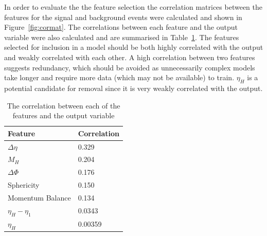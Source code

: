 	
In order to evaluate the the feature selection the correlation matrices between the features for the signal and background events were calculated and shown in Figure~\ref{fig:cormat}. 
The correlations between each feature and the output variable were also calculated and are summarised in  Table~\ref{tab:corr}. 
The features selected for inclusion in a model should be both highly correlated with the output and weakly correlated with each other. A high correlation between two features suggests redundancy, which should be avoided as unnecessarily complex models take longer and require more data (which may not be available) to train.
$\eta_{H}$ is a potential candidate for removal since it is very weakly correlated with the output.  
	\begin{table}
		\begin{center}
		\begin{tabular}{ll}
			\textbf{Feature} & \textbf{Correlation} \\
			\hline
			$\Delta\eta$ & 0.329\\			
			$M_{H}$ & 0.204 \\
			$\Delta\Phi$ &  0.176\\
			Sphericity & 0.150\\
			Momentum Balance &  0.134\\
			$\eta_H - \eta_1$ &  0.0343 \\
			$\eta_{H}$ & 0.00359\\
			
		\end{tabular}
		\end{center}
		\caption{The correlation between each of the features and the output variable}
		\label{tab:corr}
	\end{table}
	

